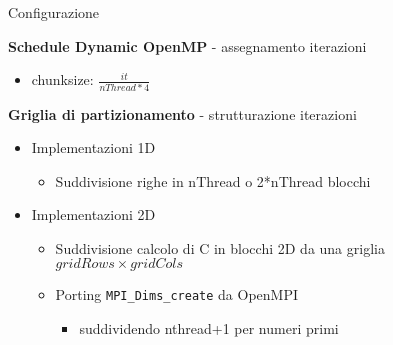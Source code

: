 \begin{frame}[fragile] {Configurazione}

{\bf Schedule Dynamic OpenMP}	\quad- assegnamento iterazioni
\begin{itemize}
	\item	chunksize: $\frac{it}{nThread*4}$
\end{itemize}
\voidLine
\pause
{\bf Griglia di partizionamento}	\quad- strutturazione iterazioni
\begin{itemize}
	\item Implementazioni 1D
	\begin{itemize}
		\item Suddivisione righe in nThread o 2*nThread blocchi
	\end{itemize}
	\item Implementazioni 2D
	\begin{itemize}
		\item Suddivisione calcolo di C in blocchi 2D
		da una griglia $gridRows \times gridCols$
		\item Porting \verb|MPI_Dims_create| da OpenMPI
		\begin{itemize}
			\item suddividendo nthread+1 per numeri primi
		\end{itemize}
	\end{itemize}
\end{itemize}

\end{frame}

